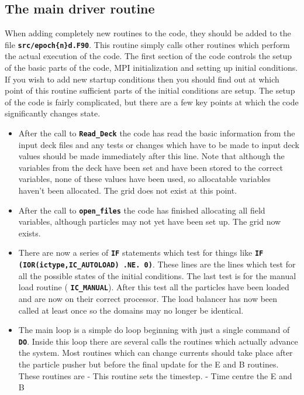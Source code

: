 \documentclass[12pt]{article}
\newcommand{\inlinecode}[1]{{\color{warwickred} \bf\texttt{#1}}}
\begin{document}
\subsection{The main driver routine}
When adding completely new routines to the code, they should be added to the
file \inlinecode{src/epoch\{n\}d.F90}. This routine simply calls other routines
which perform the actual execution of the code. The first section of the code
controls the setup of the basic parts of the code, MPI initialization and
setting up initial conditions. If you wish to add new startup conditions then
you should find out at which point of this routine sufficient parts of the
initial conditions are setup. The setup of the code is fairly complicated, but
there are a few key points at which the code significantly changes state.
\begin{itemize}
\item After the call to \inlinecode{Read\_Deck} the code has read the basic
  information from the input deck files and any tests or changes which have to
  be made to input deck values should be made immediately after this line. Note
  that although the variables from the deck have been set and have been stored
  to the correct variables, none of these values have been used, so allocatable
  variables haven't been allocated. The grid does not exist at this point.
\item After the call to \inlinecode{open\_files} the code has finished
  allocating all field variables, although particles may not yet have been set
  up. The grid now exists.
\item There are now a series of \inlinecode{IF} statements which test for
  things like \inlinecode{IF (IOR(ictype,IC\_AUTOLOAD) .NE. 0)}. These lines
  are the lines which test for all the possible states of the initial
  conditions. The last test is for the manual load routine
  (\inlinecode{IC\_MANUAL}). After this test all the particles have been loaded
  and are now on their correct processor. The load balancer has now been called
  at least once so the domains may no longer be identical.
\item The main loop is a simple do loop beginning with just a single command of
  \inlinecode{DO}. Inside this loop there are several calls the routines which
  actually advance the system. Most routines which can change currents should
  take place after the particle pusher but before the final update for the E
  and B routines. These routines are
  \subitem \inlinecode{set\_dt} - This routine sets the timestep.
  \subitem \inlinecode{update\_eb\_fields\_half} - Time centre the E and B

\end{itemize}
\end{document}
